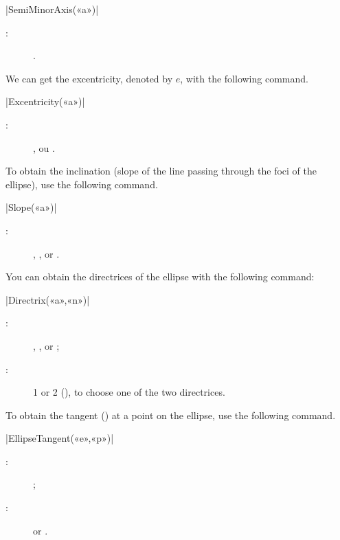 \documentclass[a4paper,english]{article}
\begin{document}
\begin{colourband}
\macro|SemiMinorAxis(«a»)|
\begin{description}
  \item[:]  .
\end{description}
\end{colourband}
\bigskip

We can get the excentricity, denoted by $e$, with the following command.

\begin{colourband}
\macro|Excentricity(«a»)|
\begin{description}
  \item[:]  ,  ou .
\end{description}
\end{colourband}
\bigskip

To obtain the inclination (slope of the line passing through the foci of the ellipse), use the following command.

\begin{colourband}
\macro|Slope(«a»)|
\begin{description}
  \item[:]  , , or .
\end{description}
\end{colourband}
\bigskip

You can obtain the directrices of the ellipse with the following command:

\begin{colourband}
\macro|Directrix(«a»,«n»)|
\begin{description}
  \item[:]  , , or 
  ; 
  \item[:]  1 or 2 (), to choose one of the two
  directrices. 
\end{description}
\end{colourband}
\bigskip
To obtain the tangent () at a point on the ellipse, use the following command.

\begin{colourband}
\macro|EllipseTangent(«e»,«p»)|
\begin{description}
  \item[:]  ;
  \item[:]   or .
\end{description}
\end{colourband}
\bigskip
\end{document}
